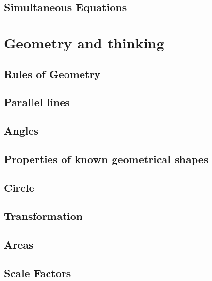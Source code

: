 \documentclass[
]{book}
\begin{document}
\hypertarget{simultaneous-equations}{%
\section{Simultaneous Equations}\label{simultaneous-equations}}

\hypertarget{geometry-and-thinking}{%
\chapter{Geometry and thinking}\label{geometry-and-thinking}}

\hypertarget{rules-of-geometry}{%
\section{Rules of Geometry}\label{rules-of-geometry}}

\hypertarget{parallel-lines}{%
\section{Parallel lines}\label{parallel-lines}}

\hypertarget{angles}{%
\section{Angles}\label{angles}}

\hypertarget{properties-of-known-geometrical-shapes}{%
\section{Properties of known geometrical shapes}\label{properties-of-known-geometrical-shapes}}

\hypertarget{circle}{%
\section{Circle}\label{circle}}

\hypertarget{transformation}{%
\section{Transformation}\label{transformation}}

\hypertarget{areas}{%
\section{Areas}\label{areas}}

\hypertarget{scale-factors}{%
\section{Scale Factors}\label{scale-factors}}
\end{document}
